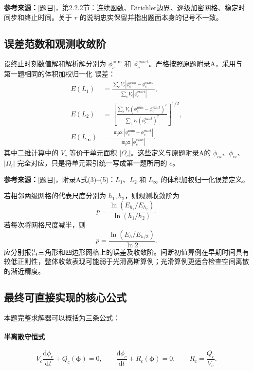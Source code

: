 \documentclass[UTF8,12pt,a4paper]{ctexart}
\numberwithin{equation}{section}
\newcommand{\Task}{\textnormal{[题目]}}
\newcommand{\source}[1]{%
  \par\smallskip
  \noindent\colorbox{sourcebg}{%
    \parbox{0.955\linewidth}{\raggedright\footnotesize\color{sourcegray}\textbf{参考来源：}#1}%
  }
  \par\smallskip
}
\begin{document}
\source{\Task，第2.2.2节：连续函数、Dirichlet边界、逐级加密网格、稳定时间步和终止时间。关于 $r$ 的说明忠实保留并指出题面本身的记号不一致。}

\subsection{误差范数和观测收敛阶}

设终止时刻数值解和解析解分别为 $\phi_c^{\mathrm{num}}$ 和
$\phi_c^{\mathrm{exact}}$。严格按照原题附录A，采用与第一题相同的体积加权归一化
误差：
\begin{align}
  E(L_1)
  &=\frac{\sum_cV_c
  |\phi_c^{\mathrm{num}}-\phi_c^{\mathrm{exact}}|}
  {\sum_cV_c|\phi_c^{\mathrm{exact}}|},
  \label{eq:L1_error}\\
  E(L_2)
  &=\left[
  \frac{\sum_cV_c
  (\phi_c^{\mathrm{num}}-\phi_c^{\mathrm{exact}})^2}
  {\sum_cV_c(\phi_c^{\mathrm{exact}})^2}
  \right]^{1/2},
  \label{eq:L2_error}\\
  E(L_\infty)
  &=\frac{
  \max_c|\phi_c^{\mathrm{num}}-\phi_c^{\mathrm{exact}}|}
  {\max_c|\phi_c^{\mathrm{exact}}|}.
  \label{eq:Linf_error}
\end{align}
其中二维计算中的 $V_c$ 等价于单元面积 $|\Omega_c|$。这些定义与原题附录A的
$\phi_{ni}$、$\phi_{ei}$、$|\Omega_i|$ 完全对应，只是将单元索引统一写成第一题所用的
$c$。

\source{\Task，附录A式(3)--(5)：$L_1$、$L_2$ 和 $L_\infty$ 的体积加权归一化误差定义。}

若相邻两级网格的代表尺度分别为 $h_1,h_2$，则观测收敛阶为
\begin{equation}
  \boxed{
  p=\frac{\ln(E_{h_1}/E_{h_2})}{\ln(h_1/h_2)}}.
  \label{eq:observed_order}
\end{equation}
若每次将网格尺度减半，则
\begin{equation}
  p=\frac{\ln(E_h/E_{h/2})}{\ln2}.
  \label{eq:order_halving}
\end{equation}
应分别报告三角形和四边形网格上的误差及收敛阶。间断初值算例在早期时间具有较低正则性，整体收敛表现可能弱于光滑高斯算例；光滑算例更适合检查空间离散的渐近精度。

\subsection{最终可直接实现的核心公式}

本题完整求解器可以概括为三条公式：

\paragraph{半离散守恒式}
\begin{equation}
  \boxed{
  V_c\frac{\mathrm d\phi_c}{\mathrm dt}
  +Q_c(\bm\phi)=0,
  \qquad
  \frac{\mathrm d\phi_c}{\mathrm dt}+R_c(\bm\phi)=0,
  \qquad
  R_c=\frac{Q_c}{V_c}.}
  \label{eq:summary_semi}
\end{equation}
\end{document}
